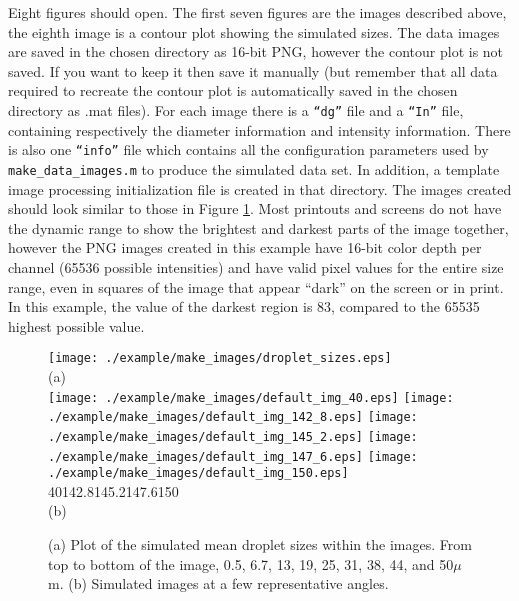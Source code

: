 Eight figures should open.  The first seven figures are the images described above, the eighth image is a contour plot showing the simulated sizes.  The data images are saved in the chosen directory as 16-bit PNG, however the contour plot is not saved.  If you want to keep it then save it manually (but remember that all data required to recreate the contour plot is automatically saved in the chosen directory as .mat files). For each image there is a \texttt{``dg''} file and a \texttt{``In''} file, containing respectively the diameter information and intensity information.  There is also one \texttt{``info''} file which contains all the configuration parameters used by \texttt{make\_data\_images.m} to produce the simulated data set.  In addition, a template image processing initialization file is created in that directory.  The images created should look similar to those in Figure \ref{default_sim_images}.  Most printouts and screens do not have the dynamic range to show the brightest and darkest parts of the image together, however the PNG images created in this example have 16-bit color depth per channel (65536 possible intensities) and have valid pixel values for the entire size range, even in squares of the image that appear ``dark'' on the screen or in print.  In this example, the value of the darkest region is 83, compared to the 65535 highest possible value.

\begin{figure}[tbp]
\begin{center}
\texttt{[image: ./example/make\_images/droplet\_sizes.eps]} \\
\hspace*{1pt} \hfill (a) \hfill \hspace*{1pt} \\
\vspace*{0.1in}
\texttt{[image: ./example/make\_images/default\_img\_40.eps]} 
\texttt{[image: ./example/make\_images/default\_img\_142\_8.eps]}
\texttt{[image: ./example/make\_images/default\_img\_145\_2.eps]}
\texttt{[image: ./example/make\_images/default\_img\_147\_6.eps]}
\texttt{[image: ./example/make\_images/default\_img\_150.eps]}\\
\hspace*{40pt} 40\textdegree \hfill 142.8\textdegree \hfill 145.2\textdegree \hfill 147.6\textdegree \hfill 150\textdegree \hspace*{40pt} \\
\vspace*{0.1in}
\hspace*{1pt} \hfill (b) \hfill \hspace*{1pt} \\
\vspace*{0.1in}
\parbox{.8\linewidth}{\caption{\label{default_sim_images}(a) Plot of the simulated mean droplet sizes within the images.  From top to bottom of the image, 0.5, 6.7, 13, 19, 25, 31, 38, 44, and 50$\mu$m. (b) Simulated images at a few representative angles. }}
\end{center}
\end{figure}

